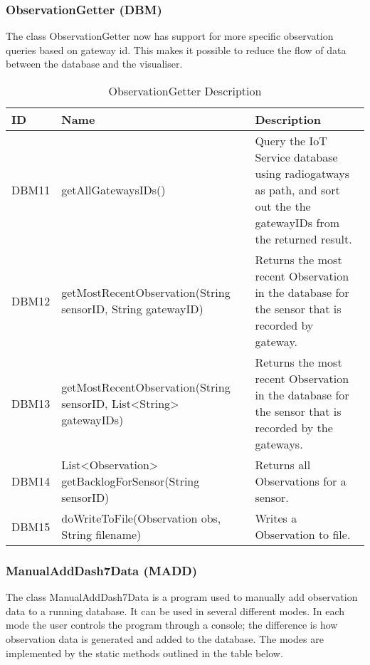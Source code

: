 \documentclass[../document]{subfiles}
\begin{document}
\subsubsection{ObservationGetter (DBM)}
The class ObservationGetter now has support for more specific observation queries based on gateway id. This makes it possible to reduce the flow of data between the database and the visualiser.

\begin{table}[H]
\caption{ObservationGetter Description}
\centering
\begin{tabularx}{\textwidth}{|L{1.1cm}|L{5.1cm}|X|}
\hline 
ID
&Name
&Description
\\ \hline DBM11
&getAllGatewaysIDs()
&Query the IoT Service database using radiogatways as path, and sort out the the gatewayIDs from the returned result.
\\ \hline DBM12
&getMostRecentObservation(String sensorID, String gatewayID)
&Returns the most recent Observation in the database for the sensor that is recorded by gateway.
\\ \hline DBM13
&getMostRecentObservation(String sensorID, List<String> gatewayIDs)
&Returns the most recent Observation in the database for the sensor that is recorded by the gateways.
\\ \hline DBM14
&List<Observation> getBacklogForSensor(String sensorID)
&Returns all Observations for a sensor.
\\ \hline DBM15
&doWriteToFile(Observation obs, String filename)
&Writes a Observation to file.
\\ \hline 
\end{tabularx}
\end{table}

\subsubsection{ManualAddDash7Data (MADD)}
The class ManualAddDash7Data is a program used to manually add observation data to a running database. It can be used in several different modes. In each mode the user controls the program through a console; the difference is how observation data is generated and added to the database. The modes are implemented by the static methods outlined in the table below.
\end{document}

